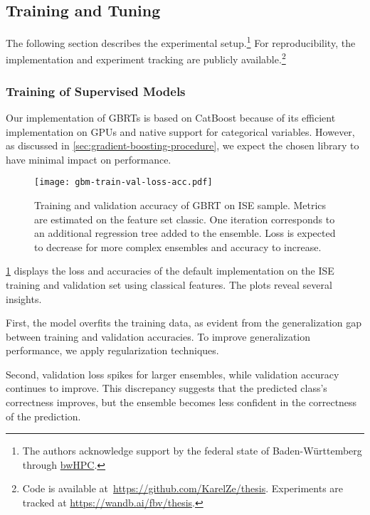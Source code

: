 \subsection{Training and Tuning}\label{sec:training-and-tuning}

The following section describes the experimental setup.\footnote{The authors acknowledge support by the federal state of Baden-Württemberg through \href{https://www.bwhpc.de/}{bwHPC}.} For reproducibility, the implementation and experiment tracking are publicly available.\footnote{Code is available at~\url{https://github.com/KarelZe/thesis}. Experiments are tracked at \url{https://wandb.ai/fbv/thesis}.}

\subsubsection{Training of Supervised
    Models}\label{sec:training-of-supervised-models}

Our implementation of \glspl{GBRT} is based on CatBoost \autocite[\checkmark][5--6]{prokhorenkovaCatBoostUnbiasedBoosting2018} because of its efficient implementation on \glspl{GPU} and native support for categorical variables. However, as discussed in \cref{sec:gradient-boosting-procedure}, we expect the chosen library to have minimal impact on performance.

\begin{figure}[ht]
    \centering
    \texttt{[image: gbm-train-val-loss-acc.pdf]}
    \caption[Training and Validation Accuracy of Gradient-Boosting]{Training and validation accuracy of \gls{GBRT} on \gls{ISE} sample. Metrics are estimated on the feature set classic. One iteration corresponds to an additional regression tree added to the ensemble. Loss is expected to decrease for more complex ensembles and accuracy to increase.}
    \label{fig:gbm-train-val-loss-acc}
\end{figure}

\cref{fig:gbm-train-val-loss-acc} displays the loss and accuracies of the default implementation on the \gls{ISE} training and validation set using classical features. The plots reveal several insights.

First, the model overfits the training data, as evident from the generalization gap between training and validation accuracies. To improve generalization performance, we apply regularization techniques.

Second, validation loss spikes for larger ensembles, while validation accuracy continues to improve. This discrepancy suggests that the predicted class's correctness improves, but the ensemble becomes less confident in the correctness of the prediction.

